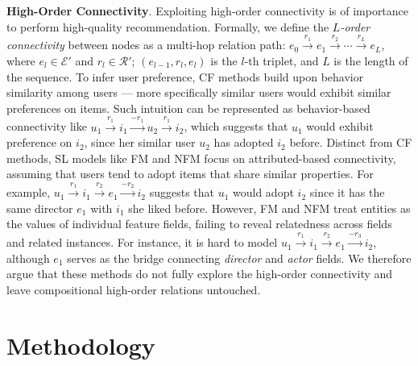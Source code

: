 \documentclass[sigconf]{acmart}
\newcommand{\Set}[1]{\mathcal{#1}}
\theoremstyle{definition}
\begin{document}
\vspace{5px}
\noindent\textbf{High-Order Connectivity}.
Exploiting high-order connectivity is of importance to perform high-quality recommendation.
Formally, we define the \emph{$L$-order connectivity} between nodes as a multi-hop relation path: $e_{0}\xrightarrow{r_{1}}e_{1}\xrightarrow{r_{2}}\cdots\xrightarrow{r_{L}}e_{L}$, where $e_{l}\in\Set{E}'$ and $r_{l}\in\Set{R}'$;
$(e_{l-1},r_{l},e_{l})$ is the $l$-th triplet, and $L$ is the length of the sequence.
To infer user preference, CF methods build upon behavior similarity among users --- more specifically similar users would exhibit similar preferences on items.
Such intuition can be represented as behavior-based connectivity like $u_1\xrightarrow{r_1} i_{1}\xrightarrow{-r_1} u_2\xrightarrow{r_1} i_2$,
which suggests that $u_1$ would exhibit preference on $i_2$, since her similar user $u_2$ has adopted $i_2$ before.
Distinct from CF methods, SL models like FM and NFM focus on attributed-based connectivity, assuming that users tend to adopt items that share similar properties.
For example, $u_1\xrightarrow{r_1} i_{1}\xrightarrow{r_2} e_1 \xrightarrow{-r_2} i_2$ suggests that $u_1$ would adopt $i_2$ since it has the same director $e_1$ with $i_1$ she liked before.
However, FM and NFM treat entities as the values of individual feature fields, failing to reveal relatedness across fields and related instances.
For instance, it is hard to model $u_1\xrightarrow{r_1} i_{1}\xrightarrow{r_2} e_1 \xrightarrow{-r_3} i_2$, although $e_1$ serves as the bridge connecting \emph{director} and \emph{actor} fields.
We therefore argue that these methods do not fully explore the high-order connectivity and leave compositional high-order relations untouched.





































%
 \section{Methodology}
\end{document}
